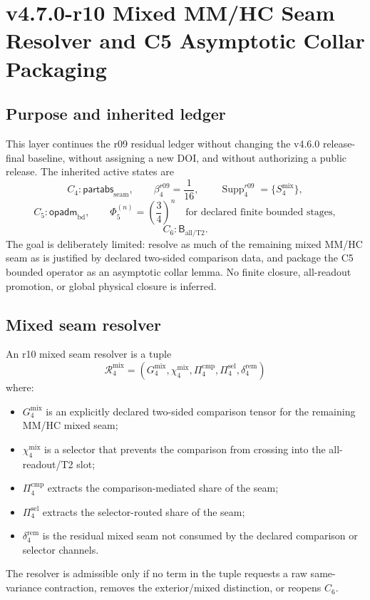 \clearpage
\section{v4.7.0-r10 Mixed MM/HC Seam Resolver and C5 Asymptotic Collar Packaging}
\label{sec:v470-r10-mixed-seam-resolver-c5-asymptotic-collar}

\subsection{Purpose and inherited ledger}
\label{subsec:v470-r10-purpose}

This layer continues the r09 residual ledger without changing the v4.6.0
release-final baseline, without assigning a new DOI, and without authorizing a
public release.  The inherited active states are
\[
C_4:\mathsf{partabs}_{\mathrm{seam}},\qquad
\beta_4^{r09}=\frac1{16},\qquad
\operatorname{Supp}_4^{r09}=\{S_4^{\mathrm{mix}}\},
\]
\[
C_5:\mathsf{opadm}_{\mathrm{bd}},\qquad
\Phi_5^{(n)}=\left(\frac34\right)^n
\quad\text{for declared finite bounded stages},
\]
\[
C_6:\mathsf B_{\mathrm{all/T2}}.
\]
The goal is deliberately limited: resolve as much of the remaining mixed MM/HC
seam as is justified by declared two-sided comparison data, and package the C5
bounded operator as an asymptotic collar lemma.  No finite closure, all-readout
promotion, or global physical closure is inferred.

\subsection{Mixed seam resolver}
\label{subsec:v470-r10-mixed-seam-resolver}

\begin{definition}
\label{def:v470-r10-mixed-seam-resolver}
An r10 mixed seam resolver is a tuple
\[
\mathcal R_4^{\mathrm{mix}}
=
(G_4^{\mathrm{mix}},\chi_4^{\mathrm{mix}},\Pi_4^{\mathrm{cmp}},
 \Pi_4^{\mathrm{sel}},\delta_4^{\mathrm{rem}})
\]
where:
\begin{itemize}
\item \(G_4^{\mathrm{mix}}\) is an explicitly declared two-sided comparison
      tensor for the remaining MM/HC mixed seam;
\item \(\chi_4^{\mathrm{mix}}\) is a selector that prevents the comparison from
      crossing into the all-readout/T2 slot;
\item \(\Pi_4^{\mathrm{cmp}}\) extracts the comparison-mediated share of the seam;
\item \(\Pi_4^{\mathrm{sel}}\) extracts the selector-routed share of the seam;
\item \(\delta_4^{\mathrm{rem}}\) is the residual mixed seam not consumed by the
      declared comparison or selector channels.
\end{itemize}
The resolver is admissible only if no term in the tuple requests a raw
same-variance contraction, removes the exterior/mixed distinction, or reopens
\(C_6\).
\end{definition}

